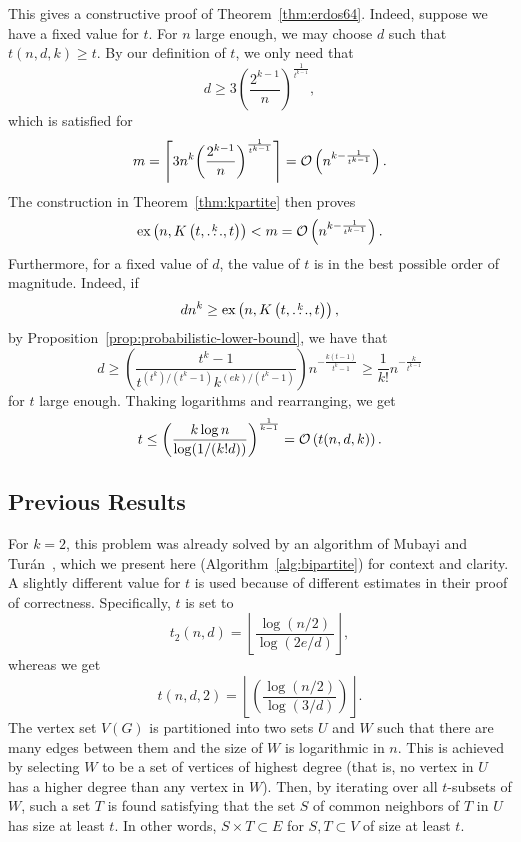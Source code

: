 This gives a constructive proof of Theorem~\ref{thm:erdos64}.
Indeed, suppose we have a fixed value for $t$.
For $n$ large enough, we may choose $d$ such that $t(n, d, k) \geq t$.
By our definition of $t$, we only need that
\[
    d \geq 3 {\left( \frac{2^{k-1}}{n}\right)}^{\frac{1}{t^{k-1}}},
\]
which is satisfied for
\[
    m =
    \left\lceil
    3 n^k {\left( \frac{2^{k-1}}{n}\right)}^{\frac{1}{t^{k-1}}}
    \right\rceil =
    \mathcal{O}\left(n^{k - \frac{1}{t^{k-1}}}\right).
\]
The construction in Theorem~\ref{thm:kpartite} then proves
\[
    \text{ex} \left( n, K\left(t, \overset{k}{\dots}, t\right) \right) < m = \mathcal{O}\left(n^{k - \frac{1}{t^{k-1}}}\right).
\]
Furthermore, for a fixed value of $d$,
the value of $t$ is in the best possible order of magnitude.
Indeed, if %
\[
    dn^k \geq \text{ex} \left( n, K\left(t, \overset{k}{\dots}, t\right) \right),
\]
by Proposition~\ref{prop:probabilistic-lower-bound}, we have that
\[
    d \geq \left( \frac{t^k - 1}{t^{(t^k)/(t^k-1)}k^{(ek)/(t^k-1)}} \right)n^{-\frac{k(t-1)}{t^{k}-1}} \geq \frac{1}{k!} n^{-\frac{k}{t^{k-1}}}
\]
for $t$ large enough.
Thaking logarithms and rearranging, we get
\[
    t \leq \left( \frac{k \log n}{\log(1/(k!d))} \right)^{\frac{1}{k-1}} = \mathcal{O}\left(t(n, d, k)\right).
\]

\subsection{Previous Results}\label{subsec:previous-results}

For $k = 2$, this problem was already solved by an algorithm of Mubayi and Turán~\cite{MUBAYI2010174},
which we present here (Algorithm~\ref{alg:bipartite}) for context and clarity.
A slightly different value for $t$ is used because of different estimates in their proof of correctness.
Specifically, $t$ is set to
\[
    t_2(n, d) = \left\lfloor \frac{\log (n/2) }{\log (2e/d)}\right\rfloor,
\]
whereas we get
\[
    t(n, d, 2) = \left\lfloor
        \left(  \frac{\log (n/2)}{\log (3/d)} \right)
       \right\rfloor.
\]
The vertex set $V(G)$ is partitioned into two sets $U$ and $W$ such that there are many edges between them
and the size of $W$ is logarithmic in $n$.
This is achieved by selecting $W$ to be a set of vertices of highest degree
(that is, no vertex in $U$ has a higher degree than any vertex in $W$).
Then, by iterating over all $t$-subsets of $W$, such a set $T$
is found satisfying that the set $S$ of common neighbors of $T$ in $U$ has size at least $t$.
In other words, $S \times T \subset E$ for $S, T \subset V$ of size at least $t$.

